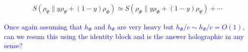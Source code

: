 \documentclass[11pt]{article}
\newcommand{\lb}{\left(}
\newcommand{\rb}{\right)}
\newcommand{\NL}[1]{\textcolor{blue}{#1}}
\begin{document}
\begin{align}
S(\rho_\Psi\|y\rho_\Psi+(1-y)\rho_\Phi)\simeq S(\rho_\Phi\|y\rho_\Phi+(1-y)\rho_\Psi) + \cdots
\end{align}


\NL{Once again assuming that $h_\Phi$ and $h_\Psi$ are very heavy but $h_\Phi/c\sim h_\Psi/c=O(1)$, can we resum this using the identity block and is the answer holographic in any sense?}
\end{document}

